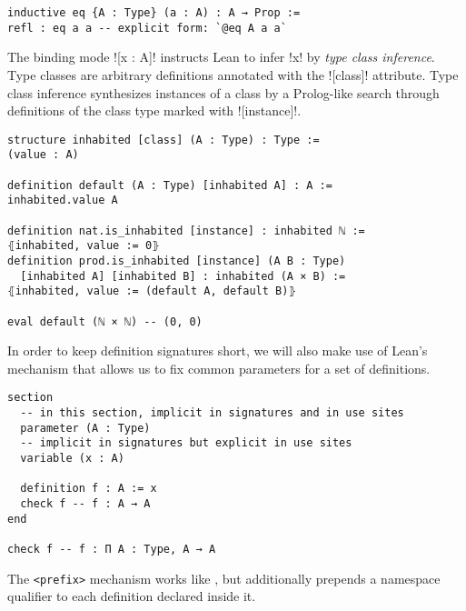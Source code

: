 \begin{verbatim}
inductive eq {A : Type} (a : A) : A → Prop :=
refl : eq a a -- explicit form: `@eq A a a`
\end{verbatim}

The binding mode \lean![x : A]! instructs Lean to infer \lean!x! by
\emph{type class inference}. Type classes are arbitrary definitions annotated with the
\lean![class]! attribute. Type class inference synthesizes instances of a class
by a Prolog-like search through definitions of the class type marked with \lean![instance]!.

\begin{verbatim}
structure inhabited [class] (A : Type) : Type :=
(value : A)

definition default (A : Type) [inhabited A] : A :=
inhabited.value A

definition nat.is_inhabited [instance] : inhabited ℕ :=
⦃inhabited, value := 0⦄
definition prod.is_inhabited [instance] (A B : Type)
  [inhabited A] [inhabited B] : inhabited (A × B) :=
⦃inhabited, value := (default A, default B)⦄

eval default (ℕ × ℕ) -- (0, 0)
\end{verbatim}

In order to keep definition signatures short, we will also make use of Lean's
 mechanism that allows us to fix common parameters for a set of definitions.

\begin{verbatim}
section
  -- in this section, implicit in signatures and in use sites
  parameter (A : Type)
  -- implicit in signatures but explicit in use sites
  variable (x : A)
  
  definition f : A := x
  check f -- f : A → A
end

check f -- f : Π A : Type, A → A
\end{verbatim}

The  \texttt{<prefix>} mechanism works like , but
additionally prepends a namespace qualifier to each definition declared inside it.